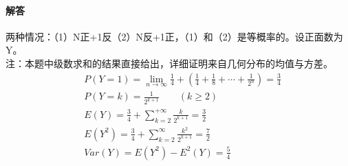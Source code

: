 \documentclass[UTF8]{ctexart}
\begin{document}
\paragraph{解答}
两种情况：（1）N正+1反（2）N反+1正，（1）和（2）是等概率的。设正面数为Y。\\
注：本题中级数求和的结果直接给出，详细证明来自几何分布的均值与方差。
\begin{equation*}
\begin{aligned}
&P(Y=1)=\lim_{n\to\infty}\frac{1}{4}+(\frac{1}{4}+\frac{1}{8}+\cdots+\frac{1}{2^n})=\frac{3}{4}\\
&P(Y=k)=\frac{1}{2^{k+1}}\quad\quad(k\geq2)\\
&E(Y)=\frac{3}{4}+\sum\limits_{k=2}^{+\infty}\frac{k}{2^{k+1}}=\frac{3}{2}\\
&E(Y^2)=\frac{3}{4}+\sum\limits_{k=2}^{\infty}\frac{k^2}{2^{k+1}}=\frac{7}{2}\\
&Var(Y)=E(Y^2)-E^2(Y)=\frac{5}{4}\\
\end{aligned}
\end{equation*}
\end{document}
